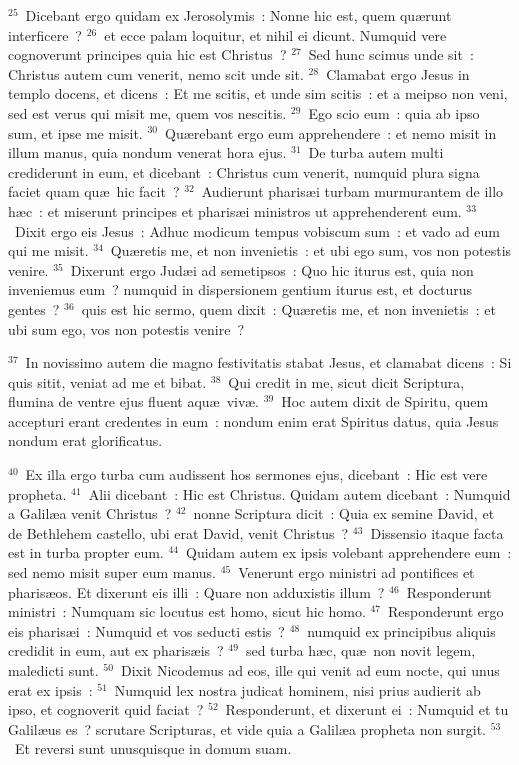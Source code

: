 ${}^{25}$~Dicebant ergo quidam ex Jerosolymis~: Nonne hic est, quem qu\ae runt interficere~?
${}^{26}$~et ecce palam loquitur, et nihil ei dicunt. Numquid vere cognoverunt principes quia hic est Christus~?
${}^{27}$~Sed hunc scimus unde sit~: Christus autem cum venerit, nemo scit unde sit.
${}^{28}$~Clamabat ergo Jesus in templo docens, et dicens~: Et me scitis, et unde sim scitis~: et a meipso non veni, sed est verus qui misit me, quem vos nescitis.
${}^{29}$~Ego scio eum~: quia ab ipso sum, et ipse me misit.
${}^{30}$~Qu\ae rebant ergo eum apprehendere~: et nemo misit in illum manus, quia nondum venerat hora ejus.
${}^{31}$~De turba autem multi crediderunt in eum, et dicebant~: Christus cum venerit, numquid plura signa faciet quam qu\ae\ hic facit~?
${}^{32}$~Audierunt pharis\ae i turbam murmurantem de illo h\ae c~: et miserunt principes et pharis\ae i ministros ut apprehenderent eum.
${}^{33}$~Dixit ergo eis Jesus~: Adhuc modicum tempus vobiscum sum~: et vado ad eum qui me misit.
${}^{34}$~Qu\ae retis me, et non invenietis~: et ubi ego sum, vos non potestis venire.
${}^{35}$~Dixerunt ergo Jud\ae i ad semetipsos~: Quo hic iturus est, quia non inveniemus eum~? numquid in dispersionem gentium iturus est, et docturus gentes~?
${}^{36}$~quis est hic sermo, quem dixit~: Qu\ae retis me, et non invenietis~: et ubi sum ego, vos non potestis venire~?


${}^{37}$~In novissimo autem die magno festivitatis stabat Jesus, et clamabat dicens~: Si quis sitit, veniat ad me et bibat.
${}^{38}$~Qui credit in me, sicut dicit Scriptura, flumina de ventre ejus fluent aqu\ae\ viv\ae .
${}^{39}$~Hoc autem dixit de Spiritu, quem accepturi erant credentes in eum~: nondum enim erat Spiritus datus, quia Jesus nondum erat glorificatus.


${}^{40}$~Ex illa ergo turba cum audissent hos sermones ejus, dicebant~: Hic est vere propheta.
${}^{41}$~Alii dicebant~: Hic est Christus. Quidam autem dicebant~: Numquid a Galil\ae a venit Christus~?
${}^{42}$~nonne Scriptura dicit~: Quia ex semine David, et de Bethlehem castello, ubi erat David, venit Christus~?
${}^{43}$~Dissensio itaque facta est in turba propter eum.
${}^{44}$~Quidam autem ex ipsis volebant apprehendere eum~: sed nemo misit super eum manus.
${}^{45}$~Venerunt ergo ministri ad pontifices et pharis\ae os. Et dixerunt eis illi~: Quare non adduxistis illum~?
${}^{46}$~Responderunt ministri~: Numquam sic locutus est homo, sicut hic homo.
${}^{47}$~Responderunt ergo eis pharis\ae i~: Numquid et vos seducti estis~?
${}^{48}$~numquid ex principibus aliquis credidit in eum, aut ex pharis\ae is~?
${}^{49}$~sed turba h\ae c, qu\ae\ non novit legem, maledicti sunt.
${}^{50}$~Dixit Nicodemus ad eos, ille qui venit ad eum nocte, qui unus erat ex ipsis~:
${}^{51}$~Numquid lex nostra judicat hominem, nisi prius audierit ab ipso, et cognoverit quid faciat~?
${}^{52}$~Responderunt, et dixerunt ei~: Numquid et tu Galil\ae us es~? scrutare Scripturas, et vide quia a Galil\ae a propheta non surgit.
${}^{53}$~Et reversi sunt unusquisque in domum suam.

